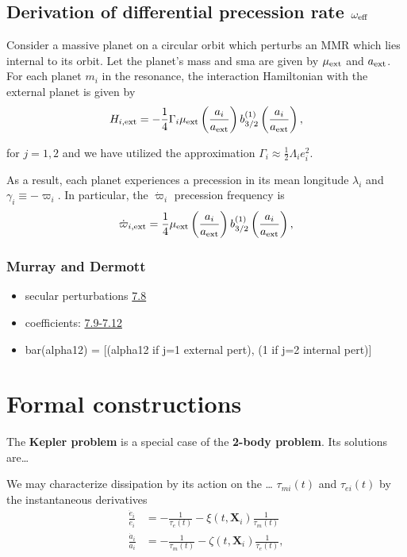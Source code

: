\documentclass[11pt]{article}
\begin{document}
\subsection{Derivation of differential precession rate \(\omega_{\rm eff}\)}
\label{sec:org88fbeb8}
Consider a massive planet on a circular orbit which perturbs an MMR
which lies internal to its orbit.  Let the planet's mass and sma are
given by \(\mu_{\rm ext}\) and \(a_{\rm ext}\).  For each planet \(m_i\) in
the resonance, the interaction Hamiltonian with the external
planet is given by
\begin{equation}
  H_{i,\rm ext} = -\frac14 \Gamma_i \mu_{\rm ext}
  \left(\frac{a_i}{a_{\rm ext}}\right) b_{3/2}^{(1)}\left(\frac{a_i}{a_{\rm ext}}\right),
\end{equation}

\noindent
for \(j=1,2\) and we have utilized the approximation \(\Gamma_i \approx \frac12 \Lambda_i e_i^2\).

As a result, each planet experiences a precession in its mean longitude \(\lambda_i\) and
\(\gamma_i\equiv -\varpi_i\). In particular, the \(\dot\varpi_i\) precession frequency
is
\begin{equation}
\dot\varpi_{i, \rm ext} = \frac14 \mu_{\rm ext} 
    \left(\frac{a_i}{a_{\rm ext}}\right) b_{3/2}^{(1)}\left(\frac{a_i}{a_{\rm ext}}\right),
\end{equation}

\subsubsection{Murray and Dermott}
\label{sec:orgf0637cd}
\begin{itemize}
\item secular perturbations \href{./images/screenshot-02.png}{7.8}
\item coefficients: \href{./images/screenshot-03.png}{7.9-7.12}
\item bar(alpha12) = [(alpha12 if j=1 external pert),  (1 if j=2 internal pert)]
\end{itemize}

\section{Formal constructions}
\label{sec:org02e812f}
The \textbf{Kepler problem} is a special case of the \textbf{2-body problem}.
Its solutions are\ldots{}

We may characterize dissipation by its action on the \ldots{}
\(\tau_{mi}(t)\) and \(\tau_{ei}(t)\) by the instantaneous derivatives
\begin{align}
   \frac{\dot e_i}{e_i} &= - \frac{1}{\tau_e(t)} - \xi(t, \mathbf X_i)\frac{1}{\tau_m(t)} \\
   \frac{\dot a_i}{a_i} &= -\frac{1}{\tau_m(t)} - \zeta(t, \mathbf X_i)\frac{1}{\tau_e(t)},
\end{align}
\noindent
\end{document}
